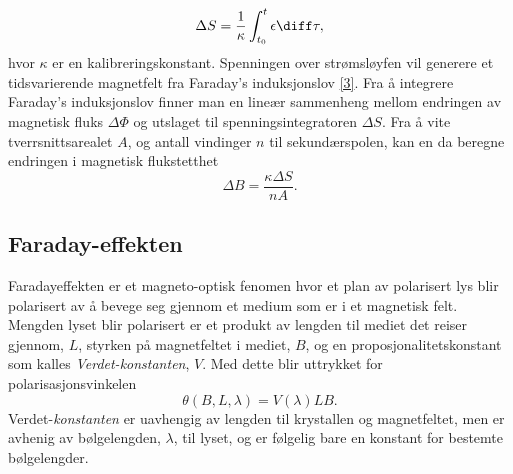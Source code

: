 \documentclass[%
 reprint,
nofootinbib,
aps,
]{revtex4-1}
\begin{document}
\begin{equation}
  \Delta S = \frac{1}{\kappa}\int_{t_0}^{t}\epsilon \diff \tau, \label{deltas_new}
\end{equation}
hvor $\kappa$ er en kalibreringskonstant. Spenningen over strømsløyfen vil generere et tidsvarierende magnetfelt fra Faraday's induksjonslov \eqref{3}. Fra å integrere Faraday's induksjonslov finner man en lineær sammenheng mellom endringen av magnetisk fluks $\Delta \Phi$ og utslaget til spenningsintegratoren $\Delta S$. Fra å vite tverrsnittsarealet $A$, og antall vindinger $n$ til sekundærspolen, kan en da beregne endringen i magnetisk flukstetthet
\begin{equation}
  \Delta B = \frac{\kappa\Delta S}{nA}.\label{deltab}
\end{equation}
\subsection{Faraday-effekten}
Faradayeffekten er et magneto-optisk fenomen hvor et plan av polarisert lys blir polarisert av å bevege seg gjennom et medium som er i et magnetisk felt. Mengden lyset blir polarisert er et produkt av lengden til mediet det reiser gjennom, $L$, styrken på magnetfeltet i mediet, $B$, og en proposjonalitetskonstant som kalles \textit{Verdet-konstanten}, $V$. Med dette blir uttrykket for polarisasjonsvinkelen
\begin{equation}
  \theta\left(B, L, \lambda\right) = V\left(\lambda\right)LB.\label{verdet}
\end{equation}
Verdet-\textit{konstanten} er uavhengig av lengden til krystallen og magnetfeltet, men er avhenig av bølgelengden, $\lambda$, til lyset, og er følgelig bare en konstant for bestemte bølgelengder.\\
\end{document}
